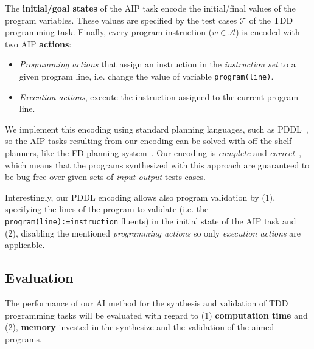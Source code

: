 \documentclass[10pt,a4paper]{paper}
\begin{document}
The {\bf initial/goal states} of the AIP task encode the initial/final values of the program variables. These values are specified by the test cases ${\mathcal T}$ of the TDD programming task. Finally, every program instruction ($w\in {\mathcal A}$) is encoded with two AIP {\bf actions}:
\begin{itemize}
\item {\it Programming actions} that assign an instruction in the {\em instruction set} to a given program line, i.e. change the value of variable {\tt program(line)}.
\item {\it Execution actions}, execute the instruction assigned to the current program line.
\end{itemize}
We implement this encoding using standard planning languages, such as PDDL~\cite{fox2003pddl2}, so the AIP tasks resulting from our encoding can be solved with off-the-shelf planners, like the {\sc FD} planning system~\cite{helmert2006fast}. Our encoding is {\em complete} and {\em correct}~\cite{segovia:programs:AIJ19}, which means that the programs synthesized with this approach are guaranteed to be bug-free over given sets of {\em input-output} tests cases.

Interestingly, our PDDL encoding allows also program validation by (1), specifying the lines of the program to validate (i.e. the {\tt program(line):=instruction} fluents) in the initial state of the AIP task and (2), disabling the mentioned {\it programming actions} so only {\it execution actions} are applicable.


\subsection{Evaluation}
\label{sec:evaluation}

The performance of our AI method for the synthesis and validation of TDD programming tasks will be evaluated with regard to (1) {\bf computation time} and (2), {\bf memory} invested in the synthesize and the validation of the aimed programs.
\end{document}

